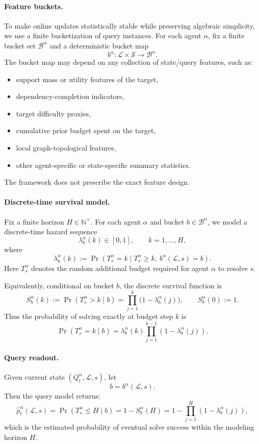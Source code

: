 \paragraph{Feature buckets.}
To make online updates statistically stable while preserving algebraic simplicity, we use a finite bucketization of query instances. For each agent $\alpha$, fix a finite bucket set $\mathcal B^\alpha$ and a deterministic bucket map
\[
b^\alpha : \mathscr L\times \mathcal S \to \mathcal B^\alpha.
\]
The bucket map may depend on any collection of state/query features, such as:
\begin{itemize}
    \item support mass or utility features of the target,
    \item dependency-completion indicators,
    \item target difficulty proxies,
    \item cumulative prior budget spent on the target,
    \item local graph-topological features,
    \item other agent-specific or state-specific summary statistics.
\end{itemize}
The framework does not prescribe the exact feature design.

\paragraph{Discrete-time survival model.}
Fix a finite horizon $H\in\mathbb N^+$. For each agent $\alpha$ and bucket $b\in\mathcal B^\alpha$, we model a discrete-time hazard sequence
\[
\lambda^\alpha_b(k)\in[0,1], \qquad k=1,\dots,H,
\]
where
\[
\lambda^\alpha_b(k)
:=
\Pr(T^\alpha_s = k \mid T^\alpha_s \ge k,\ b^\alpha(\mathcal L,s)=b).
\]
Here $T^\alpha_s$ denotes the random additional budget required for agent $\alpha$ to resolve $s$.

Equivalently, conditional on bucket $b$, the discrete survival function is
\[
S^\alpha_b(k)
:=
\Pr(T^\alpha_s > k \mid b)
=
\prod_{j=1}^{k}\big(1-\lambda^\alpha_b(j)\big),
\qquad S^\alpha_b(0):=1.
\]
Thus the probability of solving exactly at budget step $k$ is
\[
\Pr(T^\alpha_s = k \mid b)
=
\lambda^\alpha_b(k)\prod_{j=1}^{k-1}(1-\lambda^\alpha_b(j)).
\]

\paragraph{Query readout.}
Given current state $(Q^\alpha_t,\mathcal L,s)$, let
\[
b=b^\alpha(\mathcal L,s).
\]
Then the query model returns:
\[
\hat p^\alpha_t(\mathcal L,s)
=
\Pr(T^\alpha_s \le H \mid b)
=
1-S^\alpha_b(H)
=
1-\prod_{j=1}^{H}(1-\lambda^\alpha_b(j)),
\]
which is the estimated probability of eventual solve success within the modeling horizon $H$.

